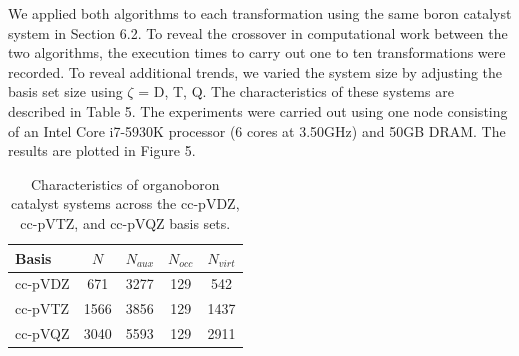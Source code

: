 We applied both algorithms to each transformation using the
same boron catalyst system in Section 6.2. To reveal the crossover in computational work between the two algorithms, 
the execution times to carry out one to ten transformations were recorded. To reveal additional trends, we varied the
system size by adjusting the basis set size using $\zeta$ = D, T, Q. The characteristics of these systems are described in Table 5.
The experiments were carried out using one node consisting of an Intel Core i7-5930K processor
(6 cores at 3.50GHz) and 50GB DRAM. The results are plotted in Figure 5.
 
\begingroup
\begin{table}[H]
\centering
\renewcommand{\baselinestretch}{1}
\caption{Characteristics of organoboron catalyst systems across the cc-pVDZ, cc-pVTZ, and cc-pVQZ basis sets.}
\begin{tabular}{l cccc}
\multicolumn{1}{l}{\textbf{Basis}} &
\multicolumn{1}{c}{\textbf{$N$}} &
\multicolumn{1}{c}{\textbf{$N_{aux}$}} &
\multicolumn{1}{c}{\textbf{$N_{occ}$}} &
\multicolumn{1}{c}{\textbf{$N_{virt}$}} \\
\hline
cc-pVDZ   & 671  & 3277      & 129       & 542        \\ 
cc-pVTZ   & 1566 & 3856      & 129       & 1437       \\ 
cc-pVQZ   & 3040 & 5593      & 129       & 2911       \\ 
\end{tabular}
\end{table}
\endgroup

